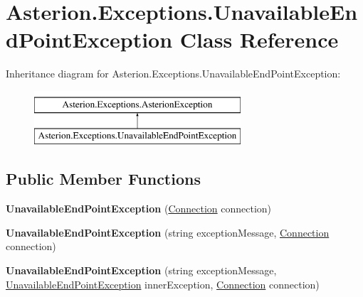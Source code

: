 \hypertarget{classAsterion_1_1Exceptions_1_1UnavailableEndPointException}{\section{Asterion.\-Exceptions.\-Unavailable\-End\-Point\-Exception Class Reference}
\label{classAsterion_1_1Exceptions_1_1UnavailableEndPointException}
}
Inheritance diagram for Asterion.\-Exceptions.\-Unavailable\-End\-Point\-Exception\-:\begin{figure}[H]
\begin{center}
\leavevmode
\includegraphics[height=2.000000cm]{classAsterion_1_1Exceptions_1_1UnavailableEndPointException}
\end{center}
\end{figure}
\subsection*{Public Member Functions}
\begin{DoxyCompactItemize}
\item 
\hypertarget{classAsterion_1_1Exceptions_1_1UnavailableEndPointException_a60fa057399023ca70747aac195c22218}{{\bfseries Unavailable\-End\-Point\-Exception} (\hyperlink{classAsterion_1_1Connection}{Connection} connection)}\label{classAsterion_1_1Exceptions_1_1UnavailableEndPointException_a60fa057399023ca70747aac195c22218}

\item 
\hypertarget{classAsterion_1_1Exceptions_1_1UnavailableEndPointException_accd7d0372dd7a51b3f86c197b1fdbc22}{{\bfseries Unavailable\-End\-Point\-Exception} (string exception\-Message, \hyperlink{classAsterion_1_1Connection}{Connection} connection)}\label{classAsterion_1_1Exceptions_1_1UnavailableEndPointException_accd7d0372dd7a51b3f86c197b1fdbc22}

\item 
\hypertarget{classAsterion_1_1Exceptions_1_1UnavailableEndPointException_aa1b84fdf81528ad8710148c1b41a10da}{{\bfseries Unavailable\-End\-Point\-Exception} (string exception\-Message, \hyperlink{classAsterion_1_1Exceptions_1_1UnavailableEndPointException}{Unavailable\-End\-Point\-Exception} inner\-Exception, \hyperlink{classAsterion_1_1Connection}{Connection} connection)}\label{classAsterion_1_1Exceptions_1_1UnavailableEndPointException_aa1b84fdf81528ad8710148c1b41a10da}

\end{DoxyCompactItemize}
